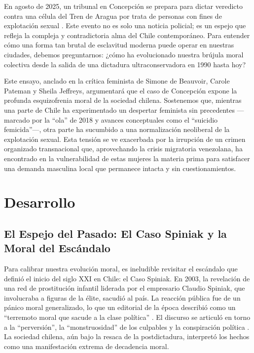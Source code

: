 \documentclass[12pt, a4paper]{article}
\begin{document}
En agosto de 2025, un tribunal en Concepción se prepara para dictar veredicto contra una célula del Tren de Aragua por trata de personas con fines de explotación sexual \cite{biobio2025}. Este evento no es solo una noticia policial; es un espejo que refleja la compleja y contradictoria alma del Chile contemporáneo. Para entender cómo una forma tan brutal de esclavitud moderna puede operar en nuestras ciudades, debemos preguntarnos: ¿cómo ha evolucionado nuestra brújula moral colectiva desde la salida de una dictadura ultraconservadora en 1990 hasta hoy?

Este ensayo, anclado en la crítica feminista de Simone de Beauvoir, Carole Pateman y Sheila Jeffreys, argumentará que el caso de Concepción expone la profunda esquizofrenia moral de la sociedad chilena. Sostenemos que, mientras una parte de Chile ha experimentado un despertar feminista sin precedentes —marcado por la ``ola'' de 2018 y avances conceptuales como el ``suicidio femicida''—, otra parte ha sucumbido a una normalización neoliberal de la explotación sexual. Esta tensión se ve exacerbada por la irrupción de un crimen organizado transnacional que, aprovechando la crisis migratoria venezolana, ha encontrado en la vulnerabilidad de estas mujeres la materia prima para satisfacer una demanda masculina local que permanece intacta y sin cuestionamientos.

\newpage
\section*{Desarrollo}

\subsection*{El Espejo del Pasado: El Caso Spiniak y la Moral del Escándalo}

Para calibrar nuestra evolución moral, es ineludible revisitar el escándalo que definió el inicio del siglo XXI en Chile: el Caso Spiniak. En 2003, la revelación de una red de prostitución infantil liderada por el empresario Claudio Spiniak, que involucraba a figuras de la élite, sacudió al país. La reacción pública fue de un pánico moral generalizado, lo que un editorial de la época describió como un ``terremoto moral que sacude a la clase política'' \cite{mercurio2003}. El discurso se articuló en torno a la ``perversión'', la ``monstruosidad'' de los culpables y la conspiración política \cite{spiniak_uchile}. La sociedad chilena, aún bajo la resaca de la postdictadura, interpretó los hechos como una manifestación extrema de decadencia moral.
\end{document}
